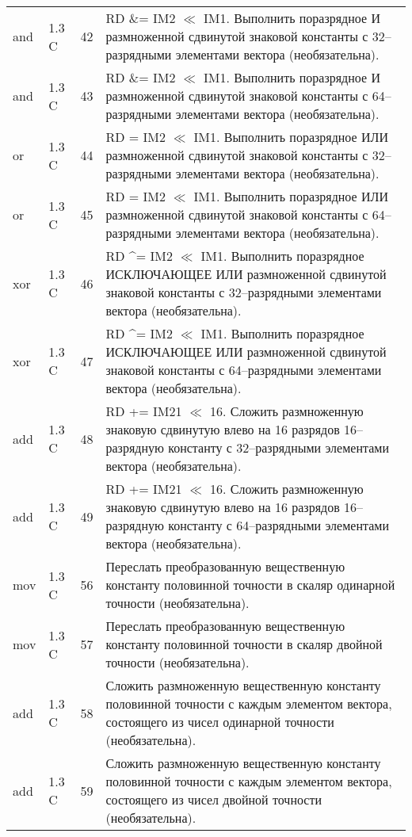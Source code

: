 \documentclass[forwardcom.tex]{subfiles}
\begin{document}
\begin{longtable}{|p{25mm}|p{16mm}|p{9mm}|p{99mm}|}
and              & 1.3 C & 42 & RD \&= IM2 $\ll$ IM1. Выполнить поразрядное И размноженной сдвинутой знаковой константы с 32--разрядными элементами вектора (необязательна). \\
and              & 1.3 C & 43 & RD \&= IM2 $\ll$ IM1. Выполнить поразрядное И размноженной сдвинутой знаковой константы с 64--разрядными элементами вектора (необязательна). \\
or               & 1.3 C & 44 & RD \textbar{}= IM2 $\ll$ IM1. Выполнить поразрядное ИЛИ размноженной сдвинутой знаковой константы с 32--разрядными элементами вектора (необязательна). \\
or               & 1.3 C & 45 & RD \textbar{}= IM2 $\ll$ IM1. Выполнить поразрядное ИЛИ размноженной сдвинутой знаковой константы с 64--разрядными элементами вектора (необязательна). \\
xor              & 1.3 C & 46 & RD \^{}= IM2 $\ll$ IM1. Выполнить поразрядное ИСКЛЮЧАЮЩЕЕ ИЛИ размноженной сдвинутой знаковой константы с 32--разрядными элементами вектора (необязательна). \\
xor              & 1.3 C & 47 & RD \^{}= IM2 $\ll$ IM1. Выполнить поразрядное ИСКЛЮЧАЮЩЕЕ ИЛИ размноженной сдвинутой знаковой константы с 64--разрядными элементами вектора (необязательна). \\
add              & 1.3 C & 48 & RD += IM21 $\ll$ 16. Сложить размноженную знаковую сдвинутую влево на 16 разрядов 16--разрядную константу с 32--разрядными элементами вектора (необязательна). \\
add              & 1.3 C & 49 & RD += IM21 $\ll$ 16. Сложить размноженную знаковую сдвинутую влево на 16 разрядов 16--разрядную константу с 64--разрядными элементами вектора (необязательна). \\
mov              & 1.3 C & 56 & Переслать преобразованную вещественную константу половинной точности в скаляр одинарной точности (необязательна). \\
mov              & 1.3 C & 57 & Переслать преобразованную вещественную константу половинной точности в скаляр двойной точности (необязательна). \\
add              & 1.3 C & 58 & Сложить размноженную вещественную константу половинной точности с каждым элементом вектора, состоящего из чисел одинарной точности (необязательна). \\
add              & 1.3 C & 59 & Сложить размноженную вещественную константу половинной точности с каждым элементом вектора, состоящего из чисел двойной точности (необязательна). \\

\end{longtable}
\end{document}
